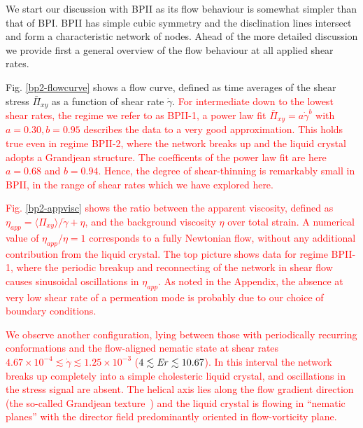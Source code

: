 \documentclass[8.5pt,twoside,twocolumn]{article}
\newcommand{\e}[1]{\times10^{#1}}
\newcommand{\gd}{\dot{\gamma}}
\newcommand{\rev}[1]{{\textcolor{red}{#1}}}
\begin{document}
We start our discussion with BPII as its flow behaviour is somewhat simpler 
than that of BPI. BPII has simple cubic symmetry and the disclination lines 
intersect and form a characteristic network of nodes.
Ahead of the more detailed discussion we provide first a general overview of the 
flow behaviour at all applied shear rates.

Fig. \ref{bp2-flowcurve} shows a flow curve, defined as time averages of 
the shear stress $\bar{\Pi}_{xy}$ as a function of shear rate $\gd$.
\rev{For intermediate down to the lowest shear rates, the regime we refer to as BPII-1, a 
power law fit $\bar{\Pi}_{xy}=a \gd^b$ with $a=0.30, b=0.95$ describes 
the data to a very good approximation.
This holds true even in regime BPII-2, where the network breaks up and 
the liquid crystal adopts a Grandjean structure. The coefficents of the power law fit are
here $a=0.68$ and $b=0.94$. Hence, the degree of shear-thinning is 
remarkably small in BPII, in the range of shear rates which we have explored here.}

\rev{Fig. \ref{bp2-appvisc} shows the ratio between the apparent viscosity, 
defined as $\eta_{app}=\langle \Pi_{xy} \rangle/\gd +\eta$, and the background viscosity $\eta$ 
over total strain.
A numerical value of $\eta_{app}/\eta=1$ corresponds to a fully Newtonian flow,
without any additional contribution from the liquid crystal.
The top picture shows data for regime BPII-1, where the periodic breakup and reconnecting of the network 
in shear flow causes sinusoidal oscillations in $\eta_{app}$. As noted in the Appendix, the
absence at very low shear rate of a permeation mode is probably due to our
choice of boundary conditions.}


\rev{We observe another configuration, lying between those with periodically recurring conformations 
and the flow-aligned nematic state at shear rates $4.67\e{-4}\lesssim\gd\lesssim1.25\e{-3}$ ($4 \lesssim {\it Er} \lesssim 10.67$). 
In this interval the network breaks up completely into a simple cholesteric liquid crystal, and oscillations in the stress signal are absent.
The helical axis lies along the flow gradient direction (the so-called Grandjean texture~\cite{deGennes})
and the liquid crystal is flowing in ``nematic planes'' with the director field predominantly oriented in flow-vorticity plane.}
\end{document}
